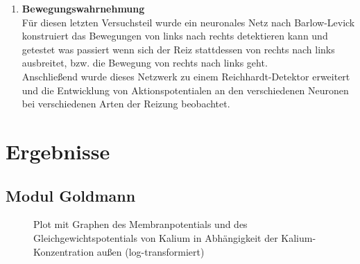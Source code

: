 \documentclass[11pt]{article}
\begin{document}
\begin{enumerate}
\item \textbf{Bewegungswahrnehmung} \\
Für diesen letzten Versuchsteil wurde ein neuronales Netz nach Barlow-Levick konstruiert das Bewegungen von links nach rechts detektieren kann und getestet was passiert wenn sich der Reiz stattdessen von rechts nach links ausbreitet, bzw. die Bewegung von rechts nach links geht.\\
Anschließend wurde dieses Netzwerk zu einem Reichhardt-Detektor erweitert und die Entwicklung von Aktionspotentialen an den verschiedenen Neuronen bei verschiedenen Arten der Reizung beobachtet.
\end{enumerate}

\section{Ergebnisse}
\subsection{Modul Goldmann}
\begin{figure}[H]
\caption{Plot mit Graphen des Membranpotentials und des Gleichgewichtspotentials von Kalium in Abhängigkeit der Kalium-Konzentration außen (log-transformiert)}
\label{plot13}
\end{figure}
\end{document}
